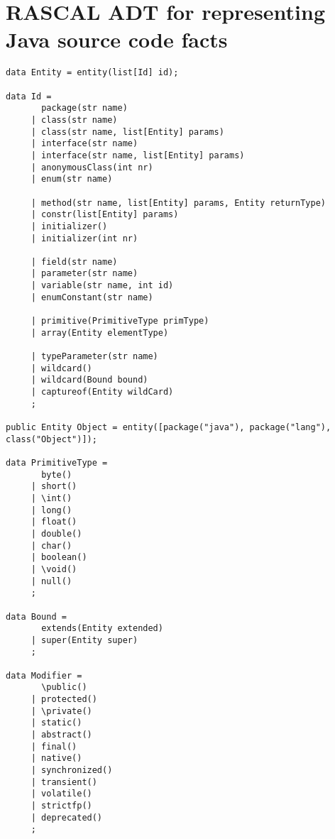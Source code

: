
\chapter{RASCAL ADT for representing Java source code facts} %

\label{AppendixA} %


\begin{lstlisting}[caption={RASCAL data model to represent Java source code facts},label={lst:javaFacts}]
data Entity = entity(list[Id] id);

data Id = 
       package(str name)
     | class(str name)
     | class(str name, list[Entity] params)
     | interface(str name)
     | interface(str name, list[Entity] params)
     | anonymousClass(int nr)
     | enum(str name)
        
     | method(str name, list[Entity] params, Entity returnType)
     | constr(list[Entity] params)
     | initializer()
     | initializer(int nr)

     | field(str name)
     | parameter(str name)
     | variable(str name, int id)
     | enumConstant(str name)
     
     | primitive(PrimitiveType primType)
     | array(Entity elementType)
     
     | typeParameter(str name)
     | wildcard()
     | wildcard(Bound bound)
     | captureof(Entity wildCard)
     ;

public Entity Object = entity([package("java"), package("lang"), class("Object")]);

data PrimitiveType = 
       byte()
     | short()
     | \int()        
     | long()
     | float()
     | double()
     | char()
     | boolean()
     | \void()       
     | null()
     ;

data Bound = 
       extends(Entity extended)
     | super(Entity super)
     ;

data Modifier = 
       \public()     
     | protected()
     | \private()    
     | static()
     | abstract()
     | final()
     | native()
     | synchronized()
     | transient()
     | volatile()
     | strictfp()
     | deprecated() 
     ;
\end{lstlisting}